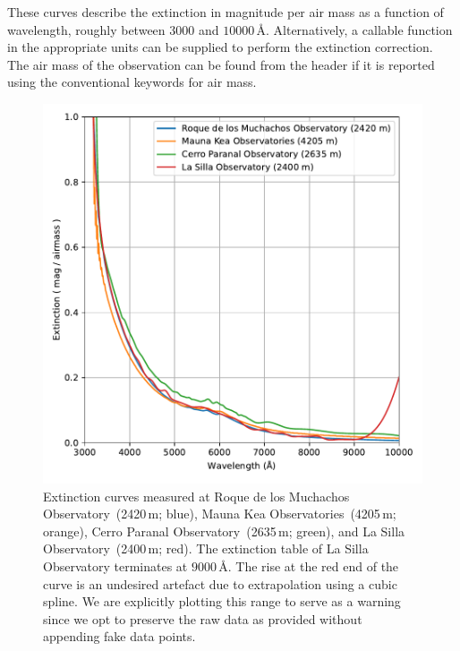 \documentclass[linenumbers, twocolumn]{aastex631}
\begin{document}
These curves describe the extinction in magnitude per air mass as a function of wavelength,
roughly between $3000$ and $10000$\,\AA. Alternatively, a callable function
in the appropriate units can be supplied to perform the extinction correction.
The air mass of the observation can be found from the header if it is reported
using the conventional keywords for air mass.
\begin{figure}
    \centering
    \includegraphics[width=\columnwidth]{fig_07_extinction_curves.pdf}
    \caption{Extinction curves measured at Roque de los
    Muchachos Observatory~(2420\,m; blue), Mauna Kea Observatories~(4205\,m;
    orange), Cerro Paranal Observatory~(2635\,m; green), and La Silla
    Observatory~(2400\,m; red). The extinction table of La Silla Observatory
    terminates at $9000$\,\AA. The rise at the red end of the curve is an
    undesired artefact due to extrapolation using a cubic spline. We are
    explicitly plotting this range to serve as a warning since we opt to
    preserve the raw data as provided without appending fake data points.}
    \label{fig:extinction}
\end{figure}

\end{document}
